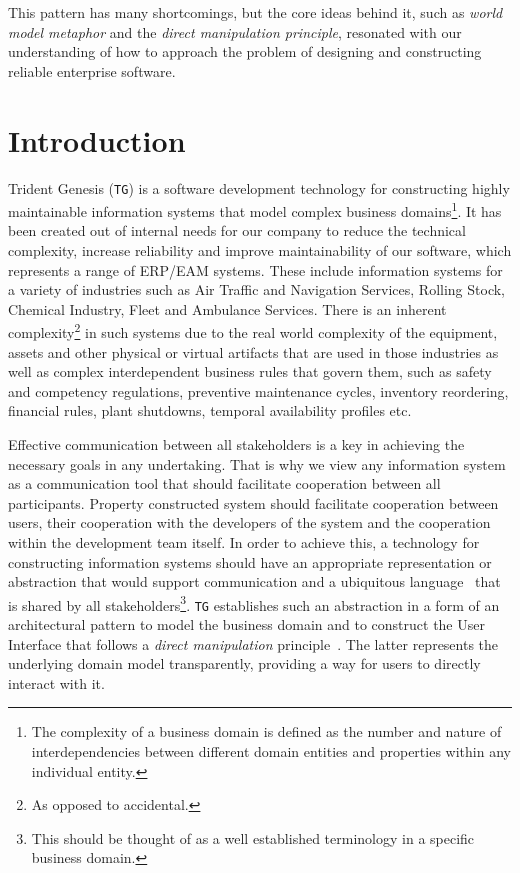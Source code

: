 \documentclass[a4paper,12pt,oneside,openright,final]{memoir} %
\begin{document}
    This pattern has many shortcomings, but the core ideas behind it, such as \emph{world model metaphor} and the \emph{direct manipulation principle}, resonated with our understanding of how to approach the problem of designing and constructing reliable enterprise software.
        
    
\section*{Introduction}
    
	Trident Genesis (\texttt{TG}) is a software development technology for constructing highly maintainable information systems that model complex business domains\footnote{The complexity of a business domain is defined as the number and nature of interdependencies between different domain entities and properties within any individual entity.}.
	It has been created out of internal needs for our company to reduce the technical complexity, increase reliability and improve maintainability of our software, which represents a range of ERP/EAM systems.
	These include information systems for a variety of industries such as Air Traffic and Navigation Services, Rolling Stock, Chemical Industry, Fleet and Ambulance Services.
	There is an inherent complexity\footnote{As opposed to accidental.} in such systems due to the real world complexity of the equipment, assets and other physical or virtual artifacts that are used in those industries as well as complex interdependent business rules that govern them, such as safety and competency regulations, preventive maintenance cycles, inventory reordering, financial rules, plant shutdowns, temporal availability profiles etc.
	
	Effective communication between all stakeholders is a key in achieving the necessary goals in any undertaking.
	That is why we view any information system as a communication tool that should facilitate cooperation between all participants. 
	Property constructed system should facilitate cooperation between users, their cooperation with the developers of the system and the cooperation within the development team itself.
	In order to achieve this, a technology for constructing information systems should have an appropriate representation or abstraction that would support communication and a ubiquitous language~\cite{evans2003} that is shared by all stakeholders\footnote{This should be thought of as a well established terminology in a specific business domain.}.
	\texttt{TG} establishes such an abstraction in a form of an architectural pattern to model the business domain and to construct the User Interface that follows a \emph{direct manipulation} principle~\cite{shneiderman1982, shneiderman1983}.
	The latter represents the underlying domain model transparently, providing a way for users to directly interact with it.
\end{document}
